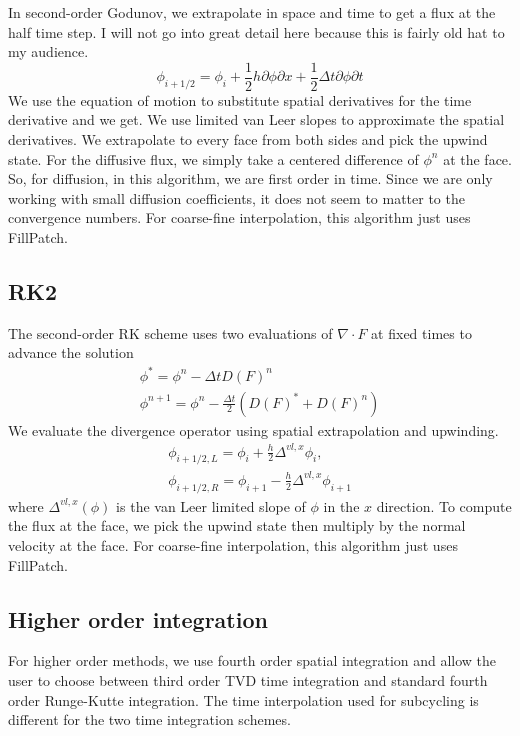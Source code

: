 \documentclass{article}
\newcommand{\dt}{{\Delta t}}
\newcommand{\dx}{{h}}
\newcommand{\half}{\frac{1}{2}}
\begin{document}
In second-order Godunov, we extrapolate in space and time to get a
flux at the half time step.   I will not go into great detail here
because this is fairly old hat to my audience.
$$
\phi_{i+1/2} = \phi_i + \half\dx \partial{\phi}{\partial x} + \half\dt \partial{\phi}{\partial t}
$$
We use the equation of motion to substitute spatial derivatives for
the time derivative and we get.   We use  limited van Leer slopes to
approximate the spatial derivatives.  We extrapolate to every face
from both sides and pick the upwind state.   For the diffusive flux,
we simply take a centered difference of $\phi^n$ at the face.  So, for
diffusion, in this algorithm, we are first order in time.   Since we
are only working with small diffusion coefficients, it does not seem
to matter to the convergence numbers.   For coarse-fine interpolation,
this algorithm just uses FillPatch.

\subsection{RK2}

The second-order RK scheme uses two evaluations of $\nabla \cdot F$ at
fixed times to advance the solution
$$
\begin{array}{l}
\phi^* = \phi^n - \dt D(F)^n\\
\phi^{n+1} = \phi^n - \frac{\dt}{2} (D(F)^* + D(F)^n)
\end{array}
$$
We evaluate the divergence operator using spatial extrapolation and
upwinding.
$$
\begin{array}{l}
\phi_{i+1/2, L} = \phi_i + \frac{\dx}{2} \Delta^{vl,x} \phi_i, \\
\phi_{i+1/2, R} = \phi_{i+1} - \frac{\dx}{2} \Delta^{vl,x} \phi_{i+1}
\end{array}
$$
where $\Delta^{vl,x}(\phi)$ is the van Leer limited slope of $\phi$ in
the $x$ direction.   To compute the flux at the face, we pick the
upwind state then multiply by the normal velocity at the face.   
 For coarse-fine interpolation,  this algorithm just uses FillPatch.

\subsection{Higher order integration}

For higher order methods, we use fourth order spatial integration and
allow the user to choose between third order TVD time integration and
standard fourth order Runge-Kutte integration.    The time
interpolation used for subcycling is different for the two time
integration schemes.
\end{document}
